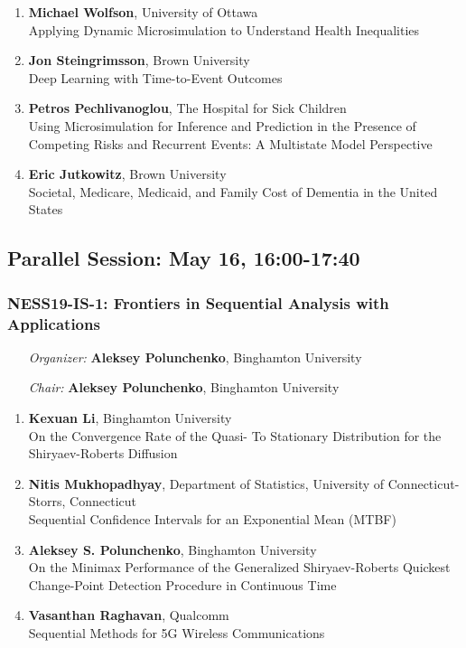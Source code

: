 \begin{enumerate}
\item \textbf{Michael Wolfson}, University of Ottawa \\
Applying Dynamic Microsimulation to Understand Health Inequalities
\item \textbf{Jon Steingrimsson}, Brown University \\
Deep Learning with Time-to-Event Outcomes
\item \textbf{Petros Pechlivanoglou}, The Hospital for Sick Children \\
Using Microsimulation for Inference and Prediction in the Presence of Competing Risks and Recurrent Events: A Multistate Model Perspective
\item \textbf{Eric Jutkowitz}, Brown University \\
Societal, Medicare, Medicaid, and Family Cost of Dementia in the United States
\end{enumerate}

\subsection*{Parallel Session: May 16, 16:00-17:40}

\subsubsection*{NESS19-IS-1: Frontiers in Sequential Analysis with Applications}

\begin{enumerate}[align=left]
\item [\emph{Organizer:}] \textbf{Aleksey Polunchenko}, Binghamton University \\
\item [\emph{Chair:}] \textbf{Aleksey Polunchenko}, Binghamton University
\end{enumerate}

\begin{enumerate}
\item \textbf{Kexuan Li}, Binghamton University \\
On the Convergence Rate of the Quasi- To Stationary Distribution for the Shiryaev-Roberts Diffusion
\item \textbf{Nitis Mukhopadhyay}, Department of Statistics, University of Connecticut-Storrs, Connecticut \\
Sequential Confidence Intervals for an Exponential Mean (MTBF)
\item \textbf{Aleksey S. Polunchenko}, Binghamton University \\
On the Minimax Performance of the Generalized Shiryaev-Roberts Quickest Change-Point Detection Procedure in Continuous Time
\item \textbf{Vasanthan Raghavan}, Qualcomm \\
Sequential Methods for 5G Wireless Communications
\end{enumerate}

